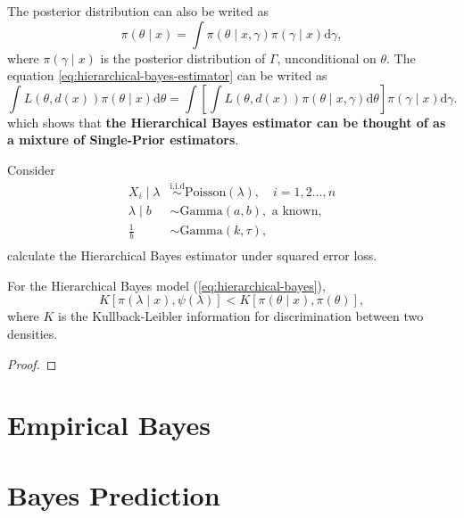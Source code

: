 \begin{note}
    The posterior distribution can also be writed as
    \begin{equation*}
        \pi\left(\theta\mid x\right)=\int\pi\left(\theta\mid x,\gamma\right)\pi\left(\gamma\mid x\right)\mathrm{d}\gamma,
    \end{equation*}
    where $\pi\left(\gamma\mid x\right)$ is the posterior distribution of $\Gamma$, unconditional on $\theta$. The equation \ref{eq:hierarchical-bayes-estimator} can be writed as
    \begin{equation*}
        \int L\left(\theta,d\left(x\right)\right)\pi\left(\theta\mid x\right)\mathrm{d}\theta = \int\left[\int L\left(\theta,d\left(x\right)\right)\pi\left(\theta\mid x,\gamma\right)\mathrm{d}\theta\right]\pi\left(\gamma\mid x\right)\mathrm{d}\gamma.
    \end{equation*}
    which shows that \textbf{the Hierarchical Bayes estimator can be thought of as a mixture of Single-Prior estimators}.
\end{note}

\begin{example}
    Consider
    \begin{equation}
        \begin{aligned}
            X_i\mid\lambda & \stackrel{\text{i.i.d}}{\sim} \text{Poisson}\left(\lambda\right),\quad i=1,2\ldots,n \\
            \lambda\mid b  & \sim \text{Gamma}\left(a,b\right), \text{ a known},                                  \\
            \frac{1}{b}    & \sim \text{Gamma}\left(k,\tau\right),                                                \\
        \end{aligned}
    \end{equation}
    calculate the Hierarchical Bayes estimator under squared error loss.
\end{example}


\begin{theorem}{}{}
    For the Hierarchical Bayes model (\ref{eq:hierarchical-bayes}),
    \begin{equation}
        K\left[\pi\left(\lambda\mid x\right),\psi\left(\lambda\right)\right] < K\left[\pi\left(\theta\mid x\right),\pi\left(\theta\right)\right],
    \end{equation}
    where $K$ is the Kullback-Leibler information for discrimination between two densities.
\end{theorem}

\begin{proof}

\end{proof}

\begin{note}

\end{note}

\section{Empirical Bayes}

\section{Bayes Prediction}